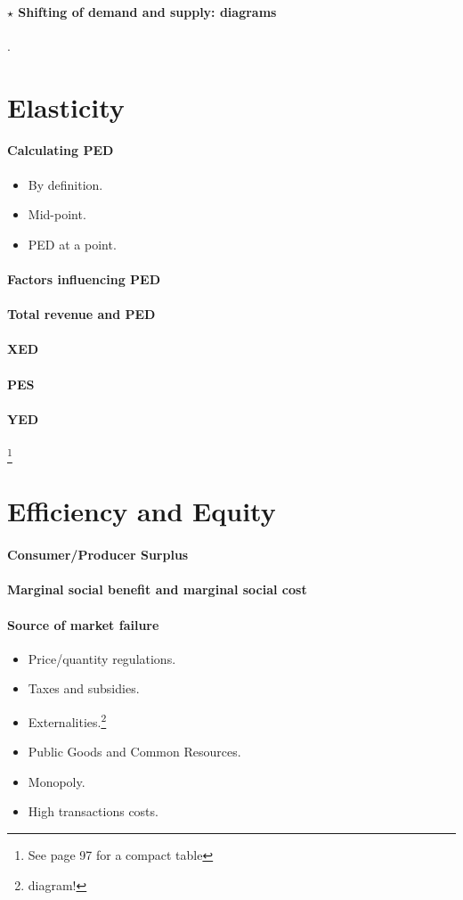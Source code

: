 \documentclass{article}
\begin{document}
	\paragraph{$\star$ Shifting of demand and supply: diagrams}.
	\section{Elasticity}
	\paragraph{Calculating PED}
	\begin{itemize}
		\item By definition.
		\item Mid-point.
		\item PED at a point.
	\end{itemize}
	\paragraph{Factors influencing PED}
	\paragraph{Total revenue and PED}
	\paragraph{XED}
	\paragraph{PES}
	\paragraph{YED}\footnote{See page 97 for a compact table}
	\section{Efficiency and Equity}
	\paragraph{Consumer/Producer Surplus}
	\paragraph{Marginal social benefit and marginal social cost}
	\paragraph{Source of market failure}
	\begin{itemize}
		\item Price/quantity regulations.
		\item Taxes and subsidies.
		\item Externalities.\footnote{diagram!}
		\item Public Goods and Common Resources.
		\item Monopoly.
		\item High transactions costs.
	\end{itemize}
\end{document}
